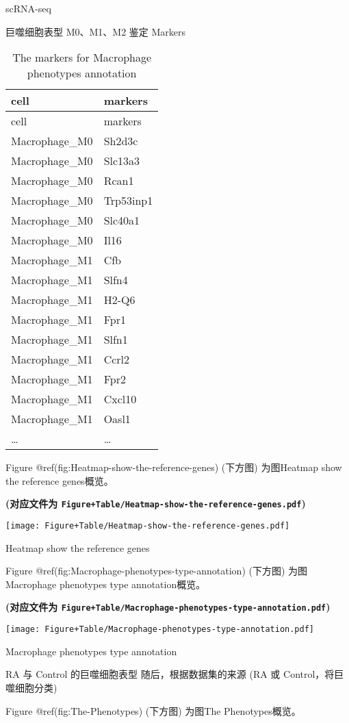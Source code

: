 \documentclass[
  ignorenonframetext,
]{beamer}
\begin{document}
\begin{frame}[fragile]{scRNA-seq}
\begin{block}{巨噬细胞表型 M0、M1、M2 鉴定 Markers}
\begin{longtable}[]{@{}ll@{}}
\caption{The markers for Macrophage phenotypes
annotation}\tabularnewline
\toprule
cell & markers\tabularnewline
\midrule
\endfirsthead
\toprule
cell & markers\tabularnewline
\midrule
\endhead
Macrophage\_M0 & Sh2d3c\tabularnewline
Macrophage\_M0 & Slc13a3\tabularnewline
Macrophage\_M0 & Rcan1\tabularnewline
Macrophage\_M0 & Trp53inp1\tabularnewline
Macrophage\_M0 & Slc40a1\tabularnewline
Macrophage\_M0 & Il16\tabularnewline
Macrophage\_M1 & Cfb\tabularnewline
Macrophage\_M1 & Slfn4\tabularnewline
Macrophage\_M1 & H2-Q6\tabularnewline
Macrophage\_M1 & Fpr1\tabularnewline
Macrophage\_M1 & Slfn1\tabularnewline
Macrophage\_M1 & Ccrl2\tabularnewline
Macrophage\_M1 & Fpr2\tabularnewline
Macrophage\_M1 & Cxcl10\tabularnewline
Macrophage\_M1 & Oasl1\tabularnewline
\ldots{} & \ldots{}\tabularnewline
\bottomrule
\end{longtable}

Figure @ref(fig:Heatmap-show-the-reference-genes) (下方图) 为图Heatmap
show the reference genes概览。

\textbf{(对应文件为
\texttt{Figure+Table/Heatmap-show-the-reference-genes.pdf})}

\def\@captype{figure}
\begin{center}
\texttt{[image: Figure+Table/Heatmap-show-the-reference-genes.pdf]}
\caption{Heatmap show the reference genes}\label{fig:Heatmap-show-the-reference-genes}
\end{center}

Figure @ref(fig:Macrophage-phenotypes-type-annotation) (下方图)
为图Macrophage phenotypes type annotation概览。

\textbf{(对应文件为
\texttt{Figure+Table/Macrophage-phenotypes-type-annotation.pdf})}

\def\@captype{figure}
\begin{center}
\texttt{[image: Figure+Table/Macrophage-phenotypes-type-annotation.pdf]}
\caption{Macrophage phenotypes type annotation}\label{fig:Macrophage-phenotypes-type-annotation}
\end{center}
\end{block}

\begin{block}{RA 与 Control 的巨噬细胞表型}
\protect\hypertarget{ra-ux4e0e-control-ux7684ux5de8ux566cux7ec6ux80deux8868ux578b}{}
随后，根据数据集的来源 (RA 或 Control，将巨噬细胞分类)

Figure @ref(fig:The-Phenotypes) (下方图) 为图The Phenotypes概览。


\end{block}
\end{frame}
\end{document}
